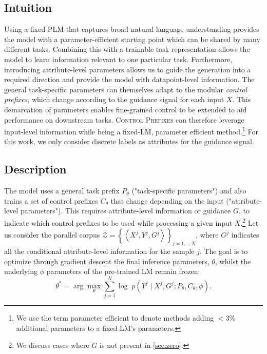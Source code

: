 \documentclass[11pt]{article}
\newcommand{\control}{\textsc{Control Prefixes}\xspace}
\begin{document}
\subsection{Intuition}
Using a fixed PLM that captures broad natural language understanding provides the model with a parameter-efficient starting point which can be shared by many different tasks.
Combining this with a trainable task representation allows the model to learn information relevant to one particular task. Furthermore, introducing attribute-level parameters allows us to guide the generation into a required direction and provide the model with datapoint-level information. The general task-specific parameters can themselves adapt to the modular \emph{control prefixes}, which change according to the guidance signal for each input $X$. This demarcation of parameters enables fine-grained control to be extended to aid performance on downstream tasks. \control can therefore leverage input-level information while being a fixed-LM, parameter efficient method.\footnote{We use the term parameter efficient to denote methods adding $<$3\% additional parameters to a fixed LM's parameters.} For this work, we only consider discrete labels as attributes for the guidance signal.



\subsection{Description}
\label{sec:Description}

The model uses a general task prefix $P_\theta$ ("task-specific parameters") and also trains a set of control prefixes $C_\theta$ that change depending on the input  ("attribute-level parameters"). This requires attribute-level information or guidance $G$, to indicate which control prefixes to be used while processing a given input $X$.\footnote{We discuss cases where $G$ is not present in \cref{sec:zero}.} Let us consider the parallel corpus $\mathcal{Z}=\left\{\left\langle X^{j}, Y^{j},G^{j}\right\rangle\right\}_{j=1, . ., N}$, where $G^{j}$ indicates all the conditional attribute-level information for the sample $j$. The goal is to optimize through gradient descent the final inference parameters, $\theta$, whilst the underlying $\phi$ parameters of the pre-trained LM remain frozen:
\begin{equation}
   \theta^{*} = \arg \max _{\theta} \sum_{j=1}^{N} \log \; p \left(Y^{j} \mid X^{j}, G^{j} ; P_\theta,C_\theta,\phi\right).
\label{eq:control}
\end{equation}
\end{document}
